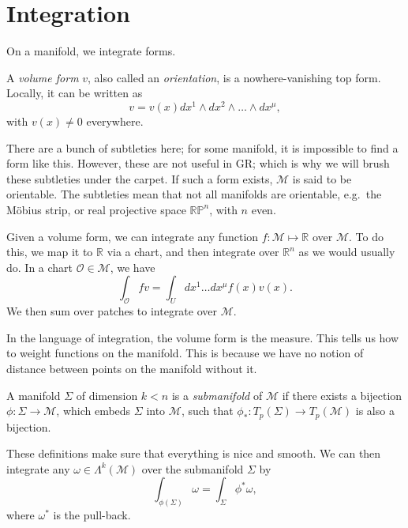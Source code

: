 \section{Integration}%
\label{sec:integration}

On a manifold, we integrate forms.
\begin{definition}
  A \emph{volume form} $v$, also called an \emph{orientation}, is a nowhere-vanishing top form.
  Locally, it can be written as
  \begin{equation}
    v = v(x) dx^1 \wedge dx^2 \wedge \dots \wedge dx^\mu,
  \end{equation}
  with $v(x) \neq 0$ everywhere.
\end{definition}
There are a bunch of subtleties here; for some manifold, it is impossible to find a form like this. 
However, these are not useful in GR; which is why we will brush these subtleties under the carpet.
If such a form exists, $\mathcal{M}$ is said to be orientable. The subtleties mean that not all manifolds are orientable, e.g.~the Möbius strip, or real projective space $\mathbb{R} \mathbb{P}^n$, with $n$ even.

Given a volume form, we can integrate any function $f\colon \mathcal{M} \mapsto \mathbb{R}$ over $\mathcal{M}$.
To do this, we map it to $\mathbb{R}$ via a chart, and then integrate over $\mathbb{R}^n$ as we would usually do.
In a chart $\mathcal{O} \in \mathcal{M}$, we have
\begin{equation}
  \int_{\mathcal{O}} fv = \int_{U} dx^1 \dots dx^\mu f(x) v(x).
\end{equation}
We then sum over patches to integrate over $\mathcal{M}$.
\begin{leftbar}
  \begin{remark}
    In the language of integration, the volume form is the measure. This tells us how to weight functions on the manifold. This is because we have no notion of distance between points on the manifold without it.
  \end{remark}
\end{leftbar}

\begin{definition}[submanifold]
  A manifold $\Sigma$ of dimension $k < n$ is a \emph{submanifold} of $\mathcal{M}$ if there exists a bijection $\phi\colon \Sigma \to \mathcal{M}$, which embeds $\Sigma$ into $\mathcal{M}$, such that $\phi_*\colon T_p(\Sigma) \to T_p(\mathcal{M})$ is also a bijection.
\end{definition}
These definitions make sure that everything is nice and smooth.
We can then integrate any $\omega \in \Lambda^k(\mathcal{M})$ over the submanifold $\Sigma$ by
\begin{equation}
  \int_{\phi(\Sigma)} \omega = \int_{\Sigma} \phi^* \omega,
\end{equation}
where $\omega^*$ is the pull-back.

